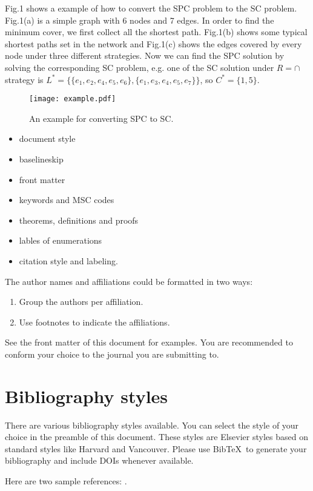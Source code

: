 \documentclass[review]{elsarticle}
\begin{document}
Fig.1 shows a example of how to convert the SPC problem to the SC problem. Fig.1(a) is a simple graph with 6 nodes and 7 edges. In order to find the minimum cover, we first collect all the shortest path. Fig.1(b) shows some typical shortest paths set in the network and Fig.1(c) shows the edges covered by every node under three different strategies. Now we can find the SPC solution by solving the corresponding SC problem, e.g. one of the SC solution under $R=\cap$ strategy is $L^*=\{\{e_1,e_2,e_4,e_5,e_6\},\{e_1,e_3,e_4,e_5,e_7\} \}$, so $C^*=\{1,5\}$.

\begin{figure}[htb]
\centering
\texttt{[image: example.pdf]}
\caption{An example for converting SPC to SC.}
\end{figure}


\begin{itemize}
\item document style
\item baselineskip
\item front matter
\item keywords and MSC codes
\item theorems, definitions and proofs
\item lables of enumerations
\item citation style and labeling.
\end{itemize}



The author names and affiliations could be formatted in two ways:
\begin{enumerate}[(1)]
\item Group the authors per affiliation.
\item Use footnotes to indicate the affiliations.
\end{enumerate}
See the front matter of this document for examples. You are recommended to conform your choice to the journal you are submitting to.

\section{Bibliography styles}

There are various bibliography styles available. You can select the style of your choice in the preamble of this document. These styles are Elsevier styles based on standard styles like Harvard and Vancouver. Please use Bib\TeX\ to generate your bibliography and include DOIs whenever available.

Here are two sample references: \cite{Feynman1963118,Dirac1953888}.



\end{document}
